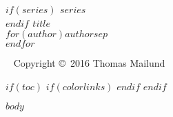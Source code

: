 \documentclass[11pt,twoside,openright]{memoir}
\begin{document}

\begingroup
\thispagestyle{empty}
{\bfseries\sffamily\noindent
$if(series)$ {\Large $series$}\\[50pt]$endif$ %
{\huge $title$}\\[35pt] %
{\huge $for(author)$$author$$sep$\\$endfor$} %
}
\vfill
\endgroup



\newpage
~\vfill
\thispagestyle{empty}
\noindent Copyright \copyright\ 2016 Thomas Mailund\\ %
\clearpage


$if(toc)$
$if(colorlinks)$
\hypersetup{linkcolor=$if(toccolor)$$toccolor$$else$black$endif$}
$endif$
\setcounter{tocdepth}{1}
\pagestyle{empty} %
\tableofcontents %
\cleardoublepage %
$endif$



\pagestyle{Ruled}
$body$

\end{document}
